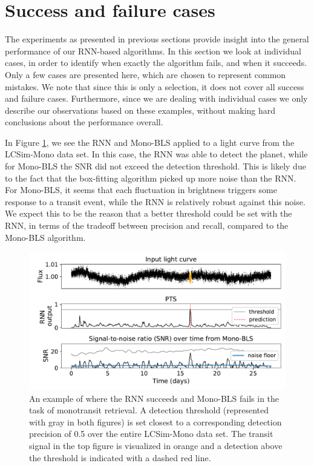 \section{Success and failure cases}
\label{sec:cases}

The experiments as presented in previous sections provide insight into the general performance of our RNN-\nobreak{}based algorithms. In this section we look at individual cases, in order to identify when exactly the algorithm fails, and when it succeeds. Only a few cases are presented here, which are chosen to represent common mistakes. We note that since this is only a selection, it does not cover all success and failure cases. Furthermore, since we are dealing with individual cases we only describe our observations based on these examples, without making hard conclusions about the performance overall.

In Figure \ref{fig:sf_mono_rnn_not_bls}, we see the RNN and Mono-BLS applied to a light curve from the LCSim-Mono data set. In this case, the RNN was able to detect the planet, while for Mono-BLS the SNR did not exceed the detection threshold. This is likely due to the fact that the box-fitting algorithm picked up more noise than the RNN. For Mono-BLS, it seems that each fluctuation in brightness triggers some response to a transit event, while the RNN is relatively robust against this noise. We expect this to be the reason that a better threshold could be set with the RNN, in terms of the tradeoff between precision and recall, compared to the Mono-BLS algorithm.

\begin{figure}
    \centering
    \includegraphics[width=0.65\linewidth]{Experiments/Figures/Cases/sf_mono_rnn_not_bls_3.pdf}
    \caption{An example of where the RNN succeeds and Mono-BLS fails in the task of monotransit retrieval. A detection threshold (represented with gray in both figures) is set closest to a corresponding detection precision of 0.5 over the entire LCSim-Mono data set. The transit signal in the top figure is visualized in orange and a detection above the threshold is indicated with a dashed red line.}
    \label{fig:sf_mono_rnn_not_bls}
\end{figure}

